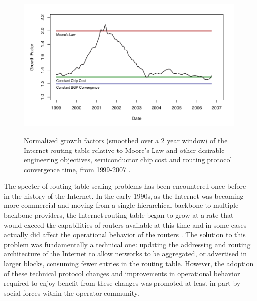 \begin{figure}
\begin{center}
    \includegraphics[width=6in]{static_figures/li_relgrowth.pdf}
    \vspace{-2em}\\
    \caption[Normalized growth factors of the Internet routing table relative to Moore's Law]{Normalized growth factors (smoothed over a 2 year window) of the Internet routing table relative to Moore's Law and other desirable engineering objectives, semiconductor chip cost and routing protocol convergence time, from 1999-2007 \cite{Li:2006cr}.}
    \label{fig:li_router_scalability}
\end{center}
\end{figure}

The specter of routing table scaling problems has been encountered once before in the history of the Internet. In the early 1990s, as the Internet was becoming more commercial and moving from a single hierarchical backbone to multiple backbone providers, the Internet routing table began to grow at a rate that would exceed the capabilities of routers available at this time \cite{Huston:2001bs} and in some cases actually did affect the operational behavior of the routers \cite{Li:2011vn}. The solution to this problem was fundamentally a technical one: updating the addressing and routing architecture of the Internet to allow networks to be aggregated, or advertised in larger blocks, consuming fewer entries in the routing table. However, the adoption of these technical protocol changes and improvements in operational behavior required to enjoy benefit from these changes was promoted at least in part by social forces within the operator community. 

